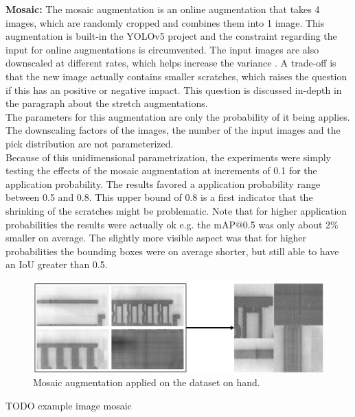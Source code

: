 \textbf{Mosaic:} The mosaic augmentation is an online augmentation that takes 4 images, which are randomly cropped and combines them into 1 image. This augmentation is built-in the YOLOv5 project and the constraint regarding the input for online augmentations is circumvented.
The input images are also downscaled at different rates, which helps increase the variance . A trade-off is that the new image actually contains smaller scratches, which raises the question if this has an positive or negative impact. This question is discussed in-depth in the paragraph about the stretch augmentations. \\
The parameters for this augmentation are only the probability of it being applies. The downscaling factors of the images, the number of the input images and the pick distribution are not parameterized. \\
Because of this unidimensional parametrization, the experiments were simply testing the effects of the mosaic augmentation at increments of 0.1 for the application probability. The results favored a application probability range between 0.5 and 0.8. This upper bound of 0.8 is a first indicator that the shrinking of the scratches might be problematic. Note that for higher application probabilities the results were actually ok e.g. the mAP@0.5 was only about 2\% smaller on average. The slightly more visible aspect was that for higher probabilities the bounding boxes were on average shorter, but still able to have an  IoU greater than 0.5. \\


\begin{figure}[!h]
\centering
\captionsetup{justification=centering,margin=2cm}
\includegraphics[width=0.8\columnwidth]{images/implementation/augmentations/mosaic_example}
\caption{Mosaic augmentation applied on the dataset on hand.}
\label{impl:mosaic}
\end{figure}

TODO example image mosaic

